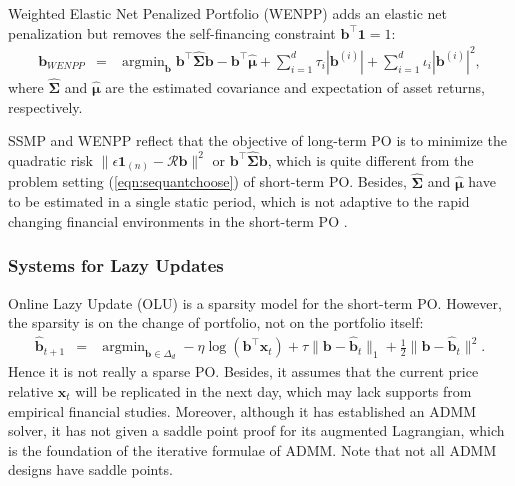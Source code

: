 \documentclass[twoside,11pt]{article}
\DeclareMathOperator*{\argmin}{argmin}
\begin{document}
Weighted Elastic Net Penalized Portfolio (WENPP) \citep{enetmeanvariance} adds an elastic net penalization \citep{elasticnet} but removes the self-financing constraint $\mathbf{b}^\top\mathbf{1}=1$:
\begin{eqnarray}
\label{eqn:wenpp}
\mathbf{b}_{WENPP}&=&\argmin_{\mathbf{b}} \mathbf{b}^\top \hat{\bm{\Sigma}}\mathbf{b}-\mathbf{b}^\top \hat{\bm{\mu}}+\sum_{i=1}^d \tau_i |\mathbf{b}^{(i)}|+ \sum_{i=1}^d \iota_i |\mathbf{b}^{(i)}|^2,
\end{eqnarray}
where $\hat{\bm{\Sigma}}$ and $\hat{\bm{\mu}}$ are the estimated covariance and expectation of asset returns, respectively. 

SSMP and WENPP reflect that the objective of long-term PO is to minimize the quadratic risk $\| \epsilon \mathbf{1}_{(n)}- \mathcal{R}\mathbf{b}\|^2$ or $\mathbf{b}^\top \hat{\bm{\Sigma}}\mathbf{b}$, which is quite different from the problem setting (\ref{eqn:sequantchoose}) of short-term PO. Besides, $\hat{\bm{\Sigma}}$ and $\hat{\bm{\mu}}$ have to be estimated in a single static period, which is not adaptive to the rapid changing financial environments in the short-term PO \citep{olazyupdate}. 

\subsubsection{Systems for Lazy Updates}
\label{sec:lazysystem}
Online Lazy Update (OLU) \citep{olazyupdate} is a sparsity model for the short-term PO. However, the sparsity is on the change of portfolio, not on the portfolio itself:
\begin{eqnarray}
\label{eqn:olu}
\hat{\mathbf{b}}_{t+1}&=&\argmin_{\mathbf{b} \in \Delta_d} -\eta \log (\mathbf{b}^\top \mathbf{x}_{t})+\tau \|\mathbf{b}-\hat{\mathbf{b}}_t\|_1+\frac{1}{2}\|\mathbf{b}-\hat{\mathbf{b}}_t\|^2.
\end{eqnarray}
Hence it is not really a sparse PO. Besides, it assumes that the current price relative $\mathbf{x}_{t}$ will be replicated in the next day, which may lack supports from empirical financial studies. Moreover, although it has established an ADMM solver, it has not given a saddle point proof for its augmented Lagrangian, which is the foundation of the iterative formulae of ADMM. Note that not all ADMM designs have saddle points.
\end{document}

